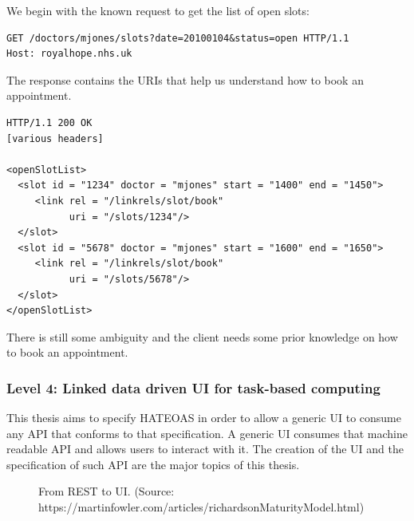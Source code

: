 We begin with the known request to get the list of open slots:

\lstset{language=}
\begin{lstlisting}[caption=Fetching the list of open slots.]
GET /doctors/mjones/slots?date=20100104&status=open HTTP/1.1
Host: royalhope.nhs.uk
\end{lstlisting}

The response contains the URIs that help us understand how to book an appointment.

\lstset{language=}
\begin{lstlisting}[caption=Level 3: The response contains information that helps us to book an appointment.]
HTTP/1.1 200 OK
[various headers]

<openSlotList>
  <slot id = "1234" doctor = "mjones" start = "1400" end = "1450">
     <link rel = "/linkrels/slot/book"
           uri = "/slots/1234"/>
  </slot>
  <slot id = "5678" doctor = "mjones" start = "1600" end = "1650">
     <link rel = "/linkrels/slot/book"
           uri = "/slots/5678"/>
  </slot>
</openSlotList>
\end{lstlisting}

There is still some ambiguity and the client needs some prior knowledge on how to book an appointment.

\subsubsection{Level 4: Linked data driven UI for task-based computing}
This thesis aims to specify HATEOAS in order to allow a generic UI to consume any API that conforms to that specification. A generic UI consumes that machine readable API and allows users to interact with it. The creation of the UI and the specification of such API are the major topics of this thesis.

\begin{figure}[!htb]
  \caption{From REST to UI. (Source: https://martinfowler.com/articles/richardsonMaturityModel.html)}
\end{figure}

